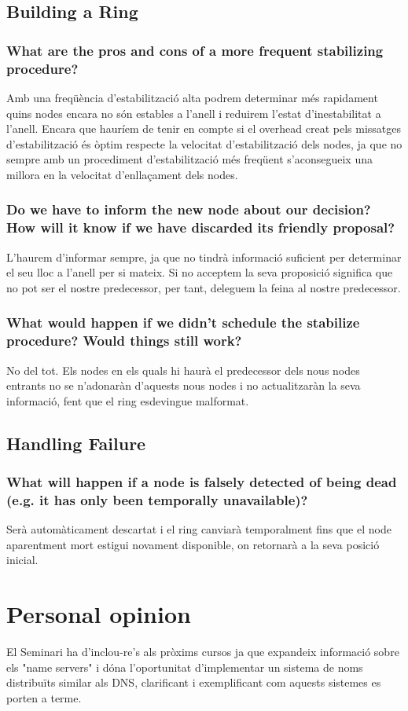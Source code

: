 \documentclass[a4paper, 10pt]{article}
\begin{document}
\subsection{Building a Ring}
\subsubsection{What are the pros and cons of a more frequent stabilizing procedure?}
Amb una freqüència d'estabilització alta podrem determinar més rapidament quins nodes encara no són estables a l'anell i reduirem l'estat d'inestabilitat a l'anell. Encara que hauríem de tenir en compte si el overhead creat pels missatges d'estabilització és òptim respecte la velocitat d'estabilització dels nodes, ja que no sempre amb un procediment d'estabilització més freqüent s'aconsegueix una millora en la velocitat d'enllaçament dels nodes.
\subsubsection{Do we have to inform the new node about our decision? How will it know if we have discarded its friendly proposal?}
L'haurem d'informar sempre, ja que no tindrà informació suficient per determinar el seu lloc a l'anell per si mateix.
Si no acceptem la seva proposició significa que no pot ser el nostre predecessor, per tant, deleguem la feina al nostre predecessor.
\subsubsection{What would happen if we didn’t schedule the stabilize procedure? Would things still work?}
No del tot. Els nodes en els quals hi haurà el predecessor dels nous nodes entrants no se n'adonaràn d'aquests nous nodes i no actualitzaràn la seva informació, fent que el ring esdevingue malformat. 
\subsection{Handling Failure}
\subsubsection{What will happen if a node is falsely detected of being dead (e.g. it has only been temporally unavailable)?}
Serà automàticament descartat i el ring canviarà temporalment fins que el node aparentment mort estigui novament disponible, on retornarà a la seva posició inicial.


\newpage\section{Personal opinion}
El Seminari ha d'inclou-re's als pròxims cursos ja que expandeix informació sobre els "name servers" i dóna l'oportunitat d'implementar un sistema de noms distribuïts similar als DNS, clarificant i exemplificant com aquests sistemes es porten a terme.
\end{document}
